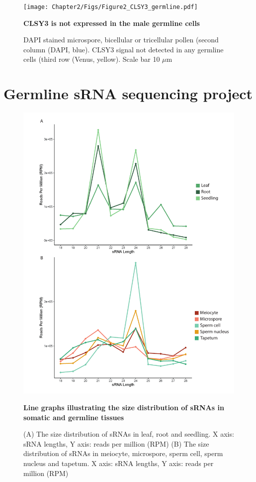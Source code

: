\begin{figure}[htbp!] 
\centering    
    \texttt{[image: Chapter2/Figs/Figure2\_CLSY3\_germline.pdf]}
\caption{\textbf{CLSY3 is not expressed in the male germline cells}}
\label{fig:CLSY3_germ}
\captionsetup{font=small}
    \caption*{DAPI stained microspore, bicellular or tricellular pollen (second column (DAPI, blue). CLSY3 signal not detected in any germline cells (third row (Venus, yellow). Scale bar 10 $\mu$m}
\end{figure}


\section{Germline sRNA sequencing project}

\begin{figure}[htbp!] 
\centering    
    \includegraphics[width=1\textwidth]{Chapter2/Figs/Figure6_sRNA_sizes.pdf}
\caption{\textbf{Line graphs illustrating the size distribution of sRNAs in somatic and germline tissues}}
\label{fig:sRNA_sizes}
\captionsetup{font=small}
    \caption*{(A) The size distribution of sRNAs in leaf, root and seedling. X axis: sRNA lengths, Y axis: reads per million (RPM) (B) The size distribution of sRNAs in meiocyte, microspore, sperm cell, sperm nucleus and tapetum. X axis: sRNA lengths, Y axis: reads per million (RPM)}
\end{figure}

